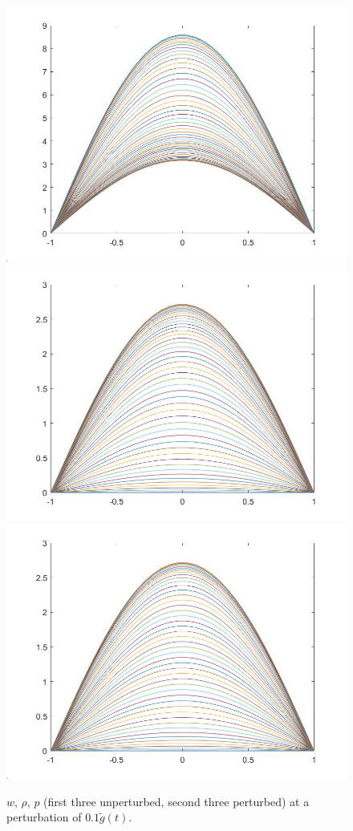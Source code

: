 \documentclass[11pt, a4paper]{article}
\theoremstyle{definition}
\begin{document}
\begin{figure}[h]
	\includegraphics[scale=0.3]{Dexprho2.jpg}
	\includegraphics[scale=0.3]{Dexpp1.jpg}
	\includegraphics[scale=0.3]{Dexpp2.jpg}
	\caption{$w$, $\rho$, $p$ (first three unperturbed, second three perturbed) at a perturbation of $0.1 \tilde g(t)$.}
	\label{Dexpsol1}
\end{figure}
\end{document}
